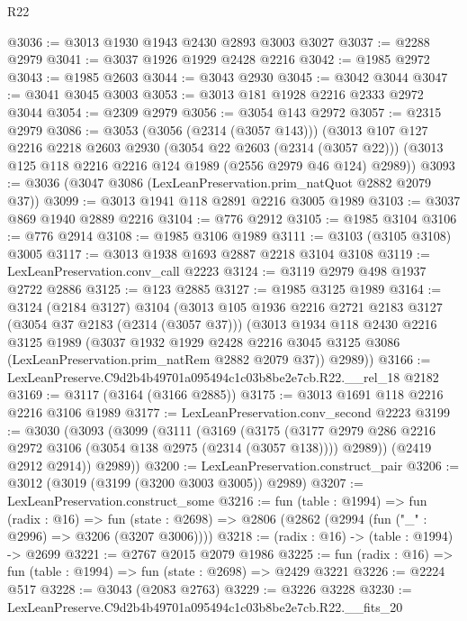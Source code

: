 \begin{lexlean}{R22}
\begin{coremodule}
@3036 := @3013 @1930 @1943 @2430 @2893 @3003 @3027
@3037 := @2288 @2979
@3041 := @3037 @1926 @1929 @2428 @2216
@3042 := @1985 @2972
@3043 := @1985 @2603
@3044 := @3043 @2930
@3045 := @3042 @3044
@3047 := @3041 @3045 @3003
@3053 := @3013 @181 @1928 @2216 @2333 @2972 @3044
@3054 := @2309 @2979
@3056 := @3054 @143 @2972
@3057 := @2315 @2979
@3086 := @3053
    (@3056 (@2314 (@3057 @143)))
    (@3013
      @107
      @127
      @2216
      @2218
      @2603
      @2930
      (@3054 @22 @2603 (@2314 (@3057 @22)))
      (@3013 @125 @118 @2216 @2216 @124 @1989 (@2556 @2979 @46 @124) @2989))
@3093 := @3036 (@3047 @3086 (LexLeanPreservation.prim_natQuot @2882 @2079 @37))
@3099 := @3013 @1941 @118 @2891 @2216 @3005 @1989
@3103 := @3037 @869 @1940 @2889 @2216
@3104 := @776 @2912
@3105 := @1985 @3104
@3106 := @776 @2914
@3108 := @1985 @3106 @1989
@3111 := @3103 (@3105 @3108) @3005
@3117 := @3013 @1938 @1693 @2887 @2218 @3104 @3108
@3119 := LexLeanPreservation.conv_call @2223
@3124 := @3119 @2979 @498 @1937 @2722 @2886
@3125 := @123 @2885
@3127 := @1985 @3125 @1989
@3164 := @3124
    (@2184 @3127)
    @3104
    (@3013
      @105
      @1936
      @2216
      @2721
      @2183
      @3127
      (@3054 @37 @2183 (@2314 (@3057 @37)))
      (@3013
        @1934
        @118
        @2430
        @2216
        @3125
        @1989
        (@3037
          @1932
          @1929
          @2428
          @2216
          @3045
          @3125
          @3086
          (LexLeanPreservation.prim_natRem @2882 @2079 @37))
        @2989))
@3166 := LexLeanPreserve.C9d2b4b49701a095494c1c03b8be2e7cb.R22.__rel_18 @2182
@3169 := @3117 (@3164 (@3166 @2885))
@3175 := @3013 @1691 @118 @2216 @2216 @3106 @1989
@3177 := LexLeanPreservation.conv_second @2223
@3199 := @3030
    (@3093
      (@3099
        (@3111
          (@3169
            (@3175
              (@3177 @2979 @286 @2216 @2972 @3106 (@3054 @138 @2975 (@2314 (@3057 @138))))
              @2989))
          (@2419 @2912 @2914))
        @2989))
@3200 := LexLeanPreservation.construct_pair
@3206 := @3012 (@3019 (@3199 (@3200 @3003 @3005)) @2989)
@3207 := LexLeanPreservation.construct_some
@3216 := fun (table : @1994) =>
  fun (radix : @16) =>
  fun (state : @2698) => @2806 (@2862 (@2994 (fun ("_" : @2996) => @3206 (@3207 @3006))))
@3218 := (radix : @16) -> (table : @1994) -> @2699
@3221 := @2767 @2015 @2079 @1986
@3225 := fun (radix : @16) => fun (table : @1994) => fun (state : @2698) => @2429 @3221
@3226 := @2224 @517
@3228 := @3043 (@2083 @2763)
@3229 := @3226 @3228
@3230 := LexLeanPreserve.C9d2b4b49701a095494c1c03b8be2e7cb.R22.__fits_20

\end{coremodule}
\end{lexlean}
